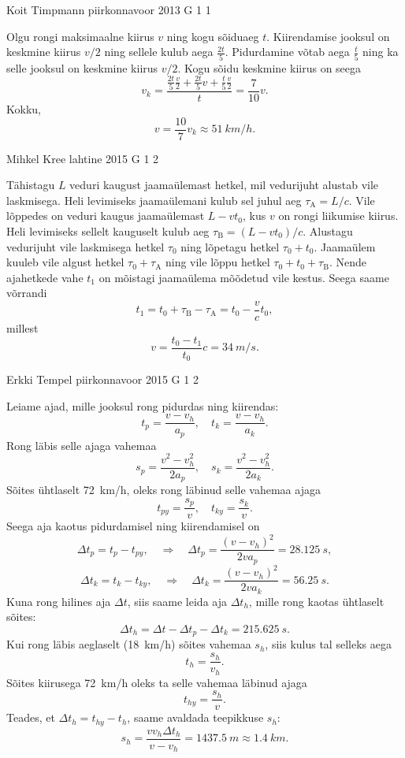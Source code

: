 \documentclass[11pt]{article}
\begin{document}
{%
{Koit Timpmann} %
{piirkonnavoor} %
{2013} %
{G 1} %
{1} %
{

\ifSolution
Olgu rongi maksimaalne kiirus $v$ ning kogu sõiduaeg $t$. Kiirendamise jooksul on keskmine kiirus $v/2$ ning sellele kulub aega $\frac{2t}{5}$. Pidurdamine võtab aega $\frac{t}{5}$ ning ka selle jooksul on keskmine kiirus $v/2$. Kogu sõidu keskmine kiirus on seega 
$$v_k = \frac{\frac{2t}{5} \frac{v}{2}+\frac{2t}{5} v + \frac{t}{5} \frac{v}{2}}{t} = \frac{7}{10} v.$$ 
Kokku,
\[
v=\frac{10}{7}v_k \approx \SI{51}{km/h}.
\]
\fi
}

{Mihkel Kree} %
{lahtine} %
{2015} %
{G 1} %
{2} %
{

\ifSolution
Tähistagu $L$ veduri kaugust jaamaülemast hetkel, mil vedurijuht alustab vile laskmisega. Heli levimiseks jaamaülemani kulub sel juhul aeg $\tau_\text{A}=L/c$. Vile lõppedes on veduri kaugus jaamaülemast $L-vt_0$, kus $v$ on rongi liikumise kiirus. Heli levimiseks sellelt kauguselt kulub aeg $\tau_\text{B}=(L-vt_0)/c$. Alustagu vedurijuht vile laskmisega hetkel $\tau_0$ ning lõpetagu hetkel $\tau_0+t_0$. Jaamaülem kuuleb vile algust hetkel $\tau_0+\tau_\text{A}$ ning vile lõppu hetkel $\tau_0+t_0+\tau_\text{B}$. Nende ajahetkede vahe $t_1$ on mõistagi jaamaülema mõõdetud vile kestus. Seega saame võrrandi
\[
t_1 = t_0+\tau_\text{B}-\tau_\text{A} = t_0 - \frac{v}{c}t_0,
\]
millest
\[
v = \frac{t_0-t_1}{t_0}c = \SI{34}{m/s}.
\]
\fi
}

{Erkki Tempel} %
{piirkonnavoor} %
{2015} %
{G 1} %
{2} %
{

\ifSolution
Leiame ajad, mille jooksul rong pidurdas ning kiirendas:
\[ t_p = \frac{v - v_h}{a_p},\quad t_k = \frac{v-v_h}{a_k}. \]
Rong läbis selle ajaga vahemaa
\[ s_p = \frac{v^2-v_h^2}{2a_p}, \quad s_k = \frac{v^2-v_h^2}{2a_k}. \]
Sõites ühtlaselt \SI{72}{km/h}, oleks rong läbinud selle vahemaa ajaga
\[ t_{py} = \frac{s_p}{v},\quad t_{ky} =\frac{s_k}{v}. \]
Seega aja kaotus pidurdamisel ning kiirendamisel on 
\[ \Delta t_p = t_{p} - t_{py}, \quad\Rightarrow\quad \Delta t_p = \frac{(v-v_h)^2}{2va_p}=\SI{28,125}{s},\]
\[ \Delta t_k = t_{k} - t_{ky}, \quad\Rightarrow\quad \Delta t_k = \frac{(v-v_h)^2}{2va_k}=\SI{56,25}{s}.\]
Kuna rong hilines aja $\Delta t$, siis saame leida aja $\Delta t_h$, mille rong kaotas ühtlaselt sõites:
\[ \Delta t_h = \Delta t - \Delta t_p - \Delta t_k = \SI{215,625}{s}. \]
Kui rong läbis aeglaselt (\SI{18}{km/h}) sõites vahemaa $s_h$, siis kulus tal selleks aega
\[ t_h = \frac{s_h}{v_h}. \]
Sõites kiirusega \SI{72}{km/h} oleks ta selle vahemaa läbinud ajaga
\[ t_{hy} = \frac{s_h}{v}. \]
Teades, et $\Delta t_h = t_{hy} - t_h$, saame avaldada teepikkuse $s_h$:
\[ s_h = \frac{vv_h\Delta t_h}{v-v_h} = \SI{1437,5}{m} \approx \SI{1,4}{km}.\] 
\fi
}

}
\end{document}
